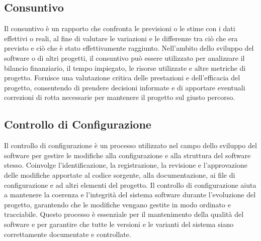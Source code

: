 \subsection{Consuntivo} 
Il consuntivo è un rapporto che confronta le previsioni o le stime con i dati effettivi o reali, al fine di valutare le variazioni e le differenze tra ciò che era previsto e ciò che è stato effettivamente raggiunto. Nell'ambito dello sviluppo del software o di altri progetti, il consuntivo può essere utilizzato per analizzare il bilancio finanziario, il tempo impiegato, le risorse utilizzate e altre metriche di progetto. Fornisce una valutazione critica delle prestazioni e dell'efficacia del progetto, consentendo di prendere decisioni informate e di apportare eventuali correzioni di rotta necessarie per mantenere il progetto sul giusto percorso.
\subsection{Controllo di Configurazione} 
Il controllo di configurazione è un processo utilizzato nel campo dello sviluppo del software per gestire le modifiche alla configurazione e alla struttura del software stesso. Coinvolge l'identificazione, la registrazione, la revisione e l'approvazione delle modifiche apportate al codice sorgente, alla documentazione, ai file di configurazione e ad altri elementi del progetto. Il controllo di configurazione aiuta a mantenere la coerenza e l'integrità del sistema software durante l'evoluzione del progetto, garantendo che le modifiche vengano gestite in modo ordinato e tracciabile. Questo processo è essenziale per il mantenimento della qualità del software e per garantire che tutte le versioni e le varianti del sistema siano correttamente documentate e controllate.
